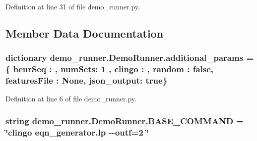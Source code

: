 Definition at line 31 of file demo\+\_\+runner.\+py.



\subsection{Member Data Documentation}
\hypertarget{classdemo__runner_1_1_demo_runner_a823a4fe7ebb0bbb8a25b7ae6966cf67f}{}
\subsubsection[{additional\+\_\+params}]{\setlength{\rightskip}{0pt plus 5cm}dictionary demo\+\_\+runner.\+Demo\+Runner.\+additional\+\_\+params = \{ \textquotesingle{}heur\+Seq\textquotesingle{} \+: \textquotesingle{}\textquotesingle{}, \textquotesingle{}num\+Sets\textquotesingle{}\+: \textquotesingle{}1\textquotesingle{} , \textquotesingle{}clingo\textquotesingle{} \+: \textquotesingle{}\textquotesingle{}, \textquotesingle{}random\textquotesingle{} \+: \textquotesingle{}false\textquotesingle{}, \textquotesingle{}features\+File\textquotesingle{} \+: \textquotesingle{}None\textquotesingle{}, \textquotesingle{}json\+\_\+output\textquotesingle{}\+: \textquotesingle{}true\textquotesingle{}\}\hspace{0.3cm}{\ttfamily [static]}}\label{classdemo__runner_1_1_demo_runner_a823a4fe7ebb0bbb8a25b7ae6966cf67f}


Definition at line 6 of file demo\+\_\+runner.\+py.

\hypertarget{classdemo__runner_1_1_demo_runner_acd6a6464762d9c2fa38a02260b0d8c3e}{}
\subsubsection[{B\+A\+S\+E\+\_\+\+C\+O\+M\+M\+A\+N\+D}]{\setlength{\rightskip}{0pt plus 5cm}string demo\+\_\+runner.\+Demo\+Runner.\+B\+A\+S\+E\+\_\+\+C\+O\+M\+M\+A\+N\+D = \char`\"{}clingo eqn\+\_\+generator.\+lp -\/-\/outf=2 \char`\"{}\hspace{0.3cm}{\ttfamily [static]}}\label{classdemo__runner_1_1_demo_runner_acd6a6464762d9c2fa38a02260b0d8c3e}


